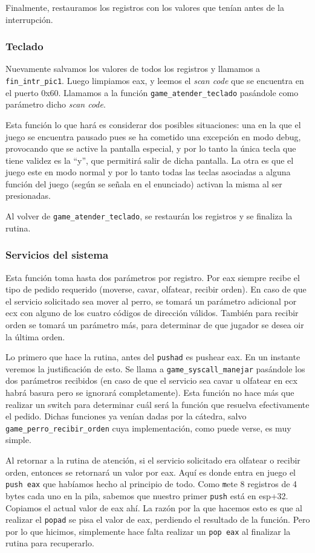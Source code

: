 	Finalmente, restauramos los registros con los valores que tenían antes de la interrupción.

	\subsubsection{Teclado}
	Nuevamente salvamos los valores de todos los registros y llamamos a \texttt{fin\_intr\_pic1}. Luego limpiamos eax, y leemos el \textit{scan code} que se encuentra en el puerto 0x60. Llamamos a la función \texttt{game\_atender\_teclado} pasándole como parámetro dicho \textit{scan code}. 

	Esta función lo que hará es considerar dos posibles situaciones: una en la que el juego se encuentra pausado pues se ha cometido una excepción en modo debug, provocando que se active la pantalla especial, y por lo tanto la única tecla que tiene validez es la ``y'', que permitirá salir de dicha pantalla. La otra es que el juego este en modo normal y por lo tanto todas las teclas asociadas a alguna función del juego (según se señala en el enunciado) activan la misma al ser presionadas.

	Al volver de \texttt{game\_atender\_teclado}, se restaurán los registros y se finaliza la rutina.

	\subsubsection{Servicios del sistema}
	Esta función toma hasta dos parámetros por registro. Por eax siempre recibe el tipo de pedido requerido (moverse, cavar, olfatear, recibir orden). En caso de que el servicio solicitado sea mover al perro, se tomará un parámetro adicional por ecx con alguno de los cuatro códigos de dirección válidos. También para recibir orden se tomará un parámetro más, para determinar de que jugador se desea oir la última orden.

	Lo primero que hace la rutina, antes del \texttt{pushad} es pushear eax. En un instante veremos la justificación de esto. Se llama a \texttt{game\_syscall\_manejar} pasándole los dos parámetros recibidos (en caso de que el servicio sea cavar u olfatear en ecx habrá basura pero se ignorará completamente). Esta función no hace más que realizar un switch para determinar cuál será la función que resuelva efectivamente el pedido. Dichas funciones ya venían dadas por la cátedra, salvo \texttt{game\_perro\_recibir\_orden} cuya implementación, como puede verse, es muy simple.

	Al retornar a la rutina de atención, si el servicio solicitado era olfatear o recibir orden, entonces se retornará un valor por eax. Aquí es donde entra en juego el \texttt{push eax} que habíamos hecho al principio de todo. Como \texttt mete 8 registros de 4 bytes cada uno en la pila, sabemos que nuestro primer \texttt{push} está en esp+32. Copiamos el actual valor de eax ahí. La razón por la que hacemos esto es que  al realizar el \texttt{popad} se pisa el valor de eax, perdiendo el resultado de la función. Pero por lo que hicimos, simplemente hace falta realizar un \texttt{pop eax} al finalizar la rutina para recuperarlo.

